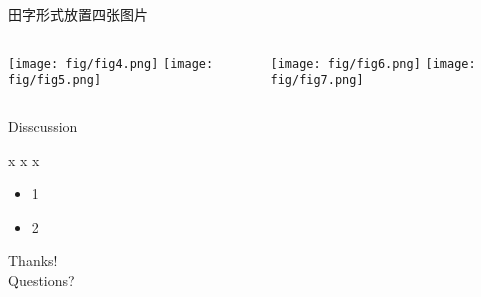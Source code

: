 \documentclass[
10pt,
aspectratio=169,
]{beamer}
\begin{document}
\begin{frame}{田字形式放置四张图片}
	\footnotesize
    \begin{columns}[onlytextwidth,T] %
        \begin{column}{0.48\textwidth}
            \centering
            \texttt{[image: fig/fig4.png]}
            \vspace{0.5em} %
            \texttt{[image: fig/fig5.png]}
        \end{column}
        \begin{column}{0.48\textwidth}
            \centering
            \texttt{[image: fig/fig6.png]}
            \vspace{0.5em}
            \texttt{[image: fig/fig7.png]}
        \end{column}
    \end{columns}
\end{frame}

\begin{frame}[c]{Disscussion}
	\footnotesize
	\begin{exampleblock}{x x x}
		\begin{itemize}
			\item 1
			\item 2
		\end{itemize}
	\end{exampleblock}
	
	
\end{frame}


	




\begin{frame}[plain]
	\vfill
	\centering
	{
		\centering \Huge \color{white} Thanks!\\[10pt]Questions?
	}
	\vfill
\end{frame}
\end{document}

